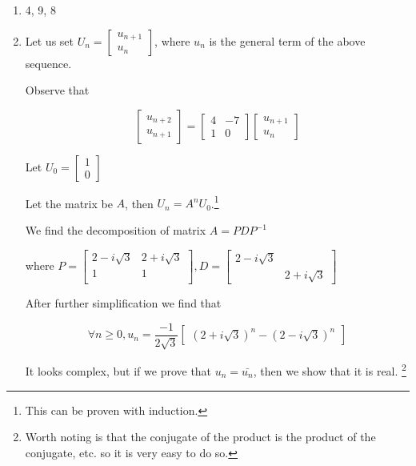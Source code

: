 	\begin{sol}
		\begin{enumerate}[1)]
			\item 4, 9, 8
			\item Let us set $U_n = \begin{bmatrix}
				u_{n+1}\\u_n
			\end{bmatrix}$, where $u_n$ is the general term of the above sequence.

			Observe that 

			\[\begin{bmatrix}
				u_{n+2}\\u_{n+1}
			\end{bmatrix} = \begin{bmatrix}
				4&-7\\1&0
			\end{bmatrix} \begin{bmatrix}
				u_{n+1}\\u_{n}
			\end{bmatrix}\]

			Let $U_0 = \begin{bmatrix}
				1\\0
			\end{bmatrix}$
			
			Let the matrix be $A$, then $U_n = A^n U_0$.\footnote{This can be proven with induction.}

			We find the decomposition of matrix $A = PDP^{-1}$ 
			
			where $P = \begin{bmatrix} 
				 2-i \sqrt{3} & 2+i \sqrt{3} \\
				 1 & 1 \\
			\end{bmatrix}, D = \begin{bmatrix}
				2 - i\sqrt{3}&\\
				&2 + i\sqrt{3}
			\end{bmatrix}$

			After further simplification we find that

			\[\forall n \geq 0, u_n = \frac{-1}{2\sqrt{3}} \begin{bmatrix}
				(2+i\sqrt{3})^n - (2-i\sqrt{3})^n
			\end{bmatrix}\]

			It looks complex, but if we prove that $u_n = \bar{u_n}$, then we show that it is real. \footnote{Worth noting is that the conjugate of the product is the product of the conjugate, etc. so it is very easy to do so.}
		\end{enumerate}
	\end{sol}